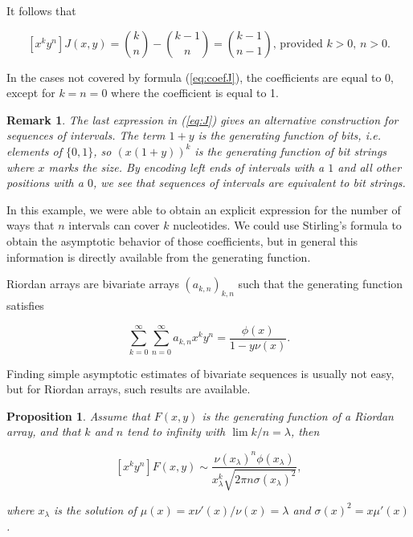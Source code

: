 \documentclass{article}
\newtheorem{proposition}{Proposition}
\newtheorem*{remark}{Remark}
\begin{document}
It follows that

\begin{equation}
\label{eq:coefJ}
[x^ky^n] J(x,y) =
{k \choose n} - {k-1 \choose n} = {k-1 \choose n-1}
\text{, provided $k > 0$, $n > 0$}.
\end{equation}

In the cases not covered by formula (\ref{eq:coefJ}), the coefficients are
equal to 0, except for $k = n = 0$ where the coefficient is equal to 1.

\begin{remark}
The last expression in (\ref{eq:J}) gives an alternative construction for
sequences of intervals. The term $1+y$ is the generating function of bits,
\textit{i.e.} elements of $\{0,1\}$, so $(x(1+y))^k$ is the generating
function of bit strings where $x$ marks the size. By encoding left ends of
intervals with a $1$ and all other positions with a $0$, we see that
sequences of intervals are equivalent to bit strings.
\end{remark}

In this example, we were able to obtain an explicit expression for the
number of ways that $n$ intervals can cover $k$ nucleotides. We could use
Stirling's formula to obtain the asymptotic behavior of those
coefficients, but in general this information is directly available from
the generating function.

Riordan arrays are bivariate arrays $(a_{k,n})_{k,n}$ such that the
generating function satisfies

\begin{equation*}
\sum_{k=0}^\infty \sum_{n=0}^\infty a_{k,n} x^k y^n =
\frac{\phi(x)}{1-y \nu(x)}.
\end{equation*}

Finding simple asymptotic estimates of bivariate sequences is usually not
easy, but for Riordan arrays, such results are available.

\begin{proposition}
\label{th:PW}
Assume that $F(x,y)$ is the generating function of a Riordan array, and
that $k$ and $n$ tend to infinity with $\lim k/n = \lambda$, then

\begin{equation}
\label{eq:assRA}
[x^ky^n]F(x,y) \sim \frac{\nu(x_\lambda)^n\phi(x_\lambda)}
  {x_\lambda^k\sqrt{2\pi n \sigma(x_\lambda)^2}},
\end{equation}

\noindent
where $x_\lambda$ is the solution of
$\mu(x) = x\nu'(x)/\nu(x) = \lambda$ and $\sigma(x)^2 = x \mu'(x)$.
\end{proposition}
\end{document}
